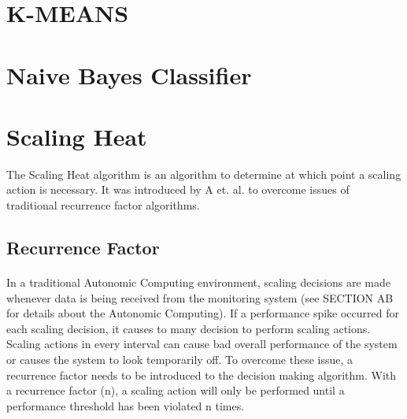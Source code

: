 \section{K-MEANS}


\section{Naive Bayes Classifier}


\section{Scaling Heat}
\label{sec:04_scal-heat}
The Scaling Heat algorithm is an algorithm to determine at which point a scaling action is necessary.
It was introduced by A et. al. to overcome issues of traditional recurrence factor algorithms.


\subsection{Recurrence Factor}
\paragraph{}In a traditional Autonomic Computing environment, scaling decisions are made whenever data is being received from the monitoring system (see SECTION AB for details about the Autonomic Computing). If a performance spike occurred for each scaling decision, it causes to many decision to perform scaling actions.
Scaling actions in every interval can cause bad overall performance of the system or causes the system to look temporarily off.
To overcome these issue, a recurrence factor needs to be introduced to the decision making algorithm.
With a recurrence factor (n), a scaling action will only be performed until a performance threshold has been violated n times.


